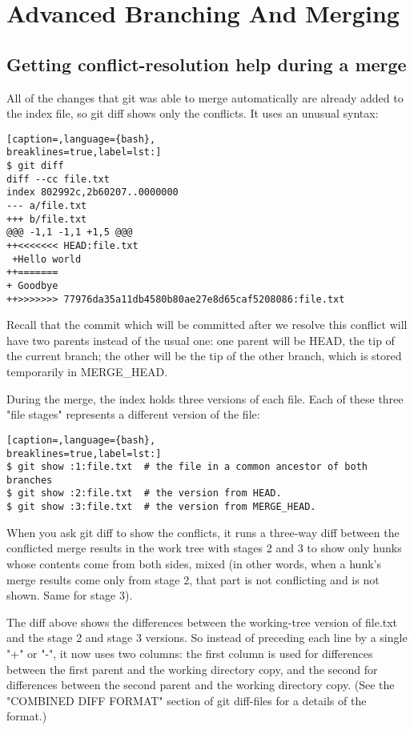 \section{Advanced Branching And Merging}
\subsection{Getting conflict-resolution help during a merge}

All of the changes that git was able to merge automatically are already added
to the index file, so git diff shows only the conflicts. It uses an unusual
syntax:
\lstset{basicstyle=\scriptsize, numbers=none, captionpos=b, tabsize=4}
\begin{lstlisting}[caption=,language={bash},
breaklines=true,label=lst:]
$ git diff
diff --cc file.txt
index 802992c,2b60207..0000000
--- a/file.txt
+++ b/file.txt
@@@ -1,1 -1,1 +1,5 @@@
++<<<<<<< HEAD:file.txt
 +Hello world
++=======
+ Goodbye
++>>>>>>> 77976da35a11db4580b80ae27e8d65caf5208086:file.txt
\end{lstlisting}

Recall that the commit which will be committed after we resolve this conflict
will have two parents instead of the usual one: one parent will be HEAD, the
tip of the current branch; the other will be the tip of the other branch, which
is stored temporarily in MERGE\_HEAD.

During the merge, the index holds three versions of each file. Each of these
three "file stages" represents a different version of the file:
\lstset{basicstyle=\scriptsize, numbers=none, captionpos=b, tabsize=4}
\begin{lstlisting}[caption=,language={bash},
breaklines=true,label=lst:]
$ git show :1:file.txt  # the file in a common ancestor of both branches
$ git show :2:file.txt  # the version from HEAD.
$ git show :3:file.txt  # the version from MERGE_HEAD.
\end{lstlisting}

When you ask git diff to show the conflicts, it runs a three-way diff between
the conflicted merge results in the work tree with stages 2 and 3 to show only
hunks whose contents come from both sides, mixed (in other words, when a hunk's
merge results come only from stage 2, that part is not conflicting and is not
shown. Same for stage 3).

The diff above shows the differences between the working-tree version of
file.txt and the stage 2 and stage 3 versions. So instead of preceding each
line by a single "+" or "-", it now uses two columns: the first column is used
for differences between the first parent and the working directory copy, and
the second for differences between the second parent and the working directory
copy. (See the "COMBINED DIFF FORMAT" section of git diff-files for a details
of the format.)

